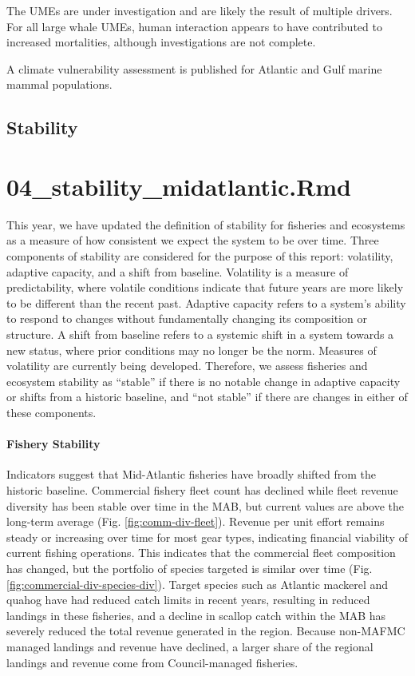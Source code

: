 \documentclass[
  10pt,
]{article}
\begin{document}
The UMEs are under investigation and are likely the result of multiple drivers. For all large whale UMEs, human interaction appears to have contributed to increased mortalities, although investigations are not complete.

A climate vulnerability assessment is published for Atlantic and Gulf marine mammal populations.

\subsection{Stability}\label{stability}

\section{04\_stability\_midatlantic.Rmd}\label{stability_midatlantic.rmd}

This year, we have updated the definition of stability for fisheries and ecosystems as a measure of how consistent we expect the system to be over time. Three components of stability are considered for the purpose of this report: volatility, adaptive capacity, and a shift from baseline. Volatility is a measure of predictability, where volatile conditions indicate that future years are more likely to be different than the recent past. Adaptive capacity refers to a system's ability to respond to changes without fundamentally changing its composition or structure. A shift from baseline refers to a systemic shift in a system towards a new status, where prior conditions may no longer be the norm. Measures of volatility are currently being developed. Therefore, we assess fisheries and ecosystem stability as ``stable'' if there is no notable change in adaptive capacity or shifts from a historic baseline, and ``not stable'' if there are changes in either of these components.

\paragraph{Fishery Stability}\label{fishery-stability}

Indicators suggest that Mid-Atlantic fisheries have broadly shifted from the historic baseline. Commercial fishery fleet count has declined while fleet revenue diversity has been stable over time in the MAB, but current values are above the long-term average (Fig. \ref{fig:comm-div-fleet}). Revenue per unit effort remains steady or increasing over time for most gear types, indicating financial viability of current fishing operations. This indicates that the commercial fleet composition has changed, but the portfolio of species targeted is similar over time (Fig. \ref{fig:commercial-div-species-div}). Target species such as Atlantic mackerel and quahog have had reduced catch limits in recent years, resulting in reduced landings in these fisheries, and a decline in scallop catch within the MAB has severely reduced the total revenue generated in the region. Because non-MAFMC managed landings and revenue have declined, a larger share of the regional landings and revenue come from Council-managed fisheries.
\end{document}
